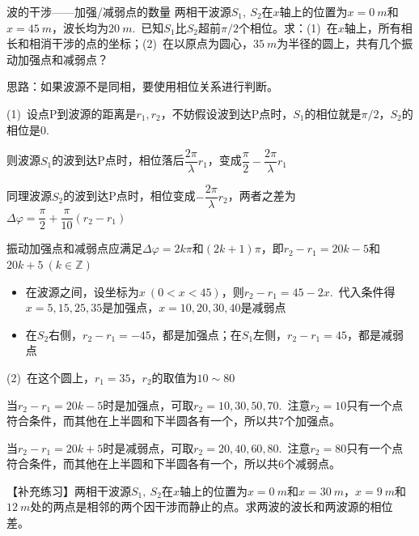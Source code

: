 \begin{example}{波的干涉——加强/减弱点的数量}
    两相干波源$S_1,~S_2$在$x$轴上的位置为$x=\SI{0}{m}$和$x=\SI{45}{m}$，波长均为$\SI{20}{m}$.~已知$S_1$比$S_2$超前$\pi/2$个相位。求：(1)~在$x$轴上，所有相长和相消干涉的点的坐标；(2)~在以原点为圆心，$\SI{35}{m}$为半径的圆上，共有几个振动加强点和减弱点？

    \tcblower
    {\fangsong 思路：如果波源不是同相，要使用相位关系进行判断。}
    \tcbline

    (1)~设点P到波源的距离是$r_1,r_2$，不妨假设波到达P点时，$S_1$的相位就是$\pi/2$，$S_2$的相位是$0$.

    \vspace{0.5em}

    则波源$S_1$的波到达P点时，相位落后$\dfrac{2\pi}{\lambda}r_1$，变成$\dfrac{\pi}{2}-\dfrac{2\pi}{\lambda}r_1$
    
    \vspace{0.5em}
    
    同理波源$S_2$的波到达P点时，相位变成$-\dfrac{2\pi}{\lambda}r_2$，两者之差为$\Delta \varphi=\dfrac{\pi}{2}+\dfrac{\pi}{10}(r_2-r_1)$

    \vspace{0.5em}

    振动加强点和减弱点应满足$\Delta \varphi=2k\pi$和$(2k+1)\pi$，即$r_2-r_1=20k-5$和$20k+5~(k\in\mathbb{Z})$

    \begin{itemize}
        \item 在波源之间，设坐标为$x~(0<x<45)$，则$r_2-r_1=45-2x$.~代入条件得$x=5,15,25,35$是加强点，$x=10,20,30,40$是减弱点
        \item 在$S_2$右侧，$r_2-r_1=-45$，都是加强点；在$S_1$左侧，$r_2-r_1=45$，都是减弱点
    \end{itemize}

    (2)~在这个圆上，$r_1=35$，$r_2$的取值为$10\sim 80$

    当$r_2-r_1=20k-5$时是加强点，可取$r_2=10,30,50,70$.~注意$r_2=10$只有一个点符合条件，而其他在上半圆和下半圆各有一个，所以共7个加强点。

    当$r_2-r_1=20k+5$时是减弱点，可取$r_2=20,40,60,80$.~注意$r_2=80$只有一个点符合条件，而其他在上半圆和下半圆各有一个，所以共6个减弱点。
    
    \tcbline
    
    【补充练习】两相干波源$S_1,~S_2$在$x$轴上的位置为$x=\SI{0}{m}$和$x=\SI{30}{m}$，$x=\SI{9}{m}$和$\SI{12}{m}$处的两点是相邻的两个因干涉而静止的点。求两波的波长和两波源的相位差。

\end{example}

